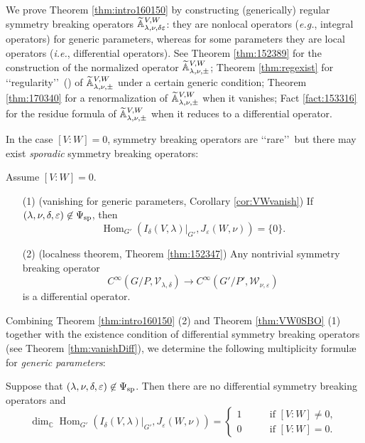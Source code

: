 We prove Theorem  \ref{thm:intro160150}
 by constructing (generically) regular symmetry breaking operators
 ${\widetilde{\mathbb{A}}}_{{\lambda},{\nu},{\delta\varepsilon}}^{{V,W}}$:
 they are nonlocal operators 
 ({\it{e.g.}}, integral operators)
 for generic parameters, 
 whereas for some parameters they are local operators
 ({\it{i.e.}}, differential operators).  
See Theorem \ref{thm:152389}
 for the construction of the normalized operator ${\widetilde{\mathbb{A}}}_{{\lambda},{\nu},{\pm}}^{{V,W}}$;
Theorem \ref{thm:regexist}
 for \lq\lq{regularity}\rq\rq\
 (\cite[Def.~3.3]{sbon})
 of ${\widetilde{\mathbb{A}}}_{{\lambda},{\nu},{\pm}}^{{V,W}}$
 under a certain generic condition;
Theorem \ref{thm:170340}
 for a renormalization of ${\widetilde{\mathbb{A}}}_{{\lambda},{\nu},{\pm}}^{{V,W}}$
 when it vanishes;
Fact \ref{fact:153316}
 for the residue formula of ${\widetilde{\mathbb{A}}}_{{\lambda},{\nu},{\pm}}^{{V,W}}$
 when it reduces to a differential operator.  


\vskip 1pc
In the case $[V:W]=0$, 
 symmetry breaking operators are \lq\lq{rare}\rq\rq\ 
 but 
there may exist {\it{sporadic}} symmetry breaking operators: 
\begin{theorem}
\label{thm:VW0SBO}
Assume $[V:W] = 0$.  
\begin{enumerate}
\item[{\rm{(1)}}]
{\rm{(vanishing for generic parameters, 
 Corollary \ref{cor:VWvanish})}}
If $(\lambda, \nu, \delta, \varepsilon) \not \in \Psi_{{\operatorname{sp}}}$,
then 
\[
   {\operatorname{Hom}}_{G'}(I_{\delta}(V,\lambda)|_{G'}, J_{\varepsilon}(W,\nu))=\{0\}.  
\] 
\item[{\rm{(2)}}]
{\rm{(localness theorem, Theorem \ref{thm:152347})}}
Any nontrivial symmetry breaking operator
\[
   C^{\infty}(G/P, {\mathcal{V}}_{\lambda,\delta})
   \to 
   C^{\infty}(G'/P', {\mathcal{W}}_{\nu,\varepsilon})
\]
is a differential operator.  
\end{enumerate}
\end{theorem}


Combining Theorem \ref{thm:intro160150} (2) and Theorem \ref{thm:VW0SBO} (1)
 together with the existence condition
 of differential symmetry breaking operators 
 (see Theorem \ref{thm:vanishDiff}), 
 we determine the following multiplicity formul{\ae}
 for {\it{generic parameters}}:
\begin{theorem}
Suppose that $(\lambda,\nu, \delta,\varepsilon) \not \in \Psi_{{\operatorname{sp}}}$.   
Then there are no differential symmetry breaking operators and
\[
     {\operatorname{dim}}_{\mathbb{C}} {\operatorname{Hom}}_{G'}(I_\delta(V,\lambda)|_{G'},J_\varepsilon (W,\nu))
=
\begin{cases}
 1 \qquad&\text{if $[V:W]\ne0$, }
\\
 0 \qquad&\text{if $[V:W]=0$.  }
\end{cases}
\]
\end{theorem}



